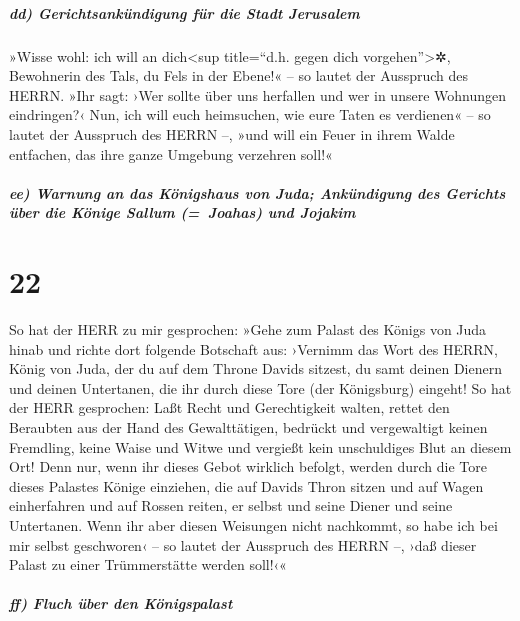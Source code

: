 \hypertarget{dd-gerichtsankuxfcndigung-fuxfcr-die-stadt-jerusalem}{%
\subparagraph{dd) Gerichtsankündigung für die Stadt
Jerusalem}\label{dd-gerichtsankuxfcndigung-fuxfcr-die-stadt-jerusalem}}

»Wisse wohl: ich will an dich\textless sup title=``d.h.
gegen dich vorgehen''\textgreater✲, Bewohnerin des Tals, du Fels in der
Ebene!« -- so lautet der Ausspruch des HERRN. »Ihr sagt: ›Wer sollte
über uns herfallen und wer in unsere Wohnungen eindringen?‹
Nun, ich will euch heimsuchen, wie eure Taten es
verdienen« -- so lautet der Ausspruch des HERRN --, »und will ein Feuer
in ihrem Walde entfachen, das ihre ganze Umgebung verzehren soll!«

\hypertarget{ee-warnung-an-das-kuxf6nigshaus-von-juda-ankuxfcndigung-des-gerichts-uxfcber-die-kuxf6nige-sallum-joahas-und-jojakim}{%
\subparagraph{ee) Warnung an das Königshaus von Juda; Ankündigung des
Gerichts über die Könige Sallum (=~Joahas) und
Jojakim}\label{ee-warnung-an-das-kuxf6nigshaus-von-juda-ankuxfcndigung-des-gerichts-uxfcber-die-kuxf6nige-sallum-joahas-und-jojakim}}

\hypertarget{section-21}{%
\section{22}\label{section-21}}

So hat der HERR zu mir gesprochen: »Gehe zum Palast des
Königs von Juda hinab und richte dort folgende Botschaft aus:
›Vernimm das Wort des HERRN, König von Juda, der du auf
dem Throne Davids sitzest, du samt deinen Dienern und deinen Untertanen,
die ihr durch diese Tore (der Königsburg) eingeht! So hat
der HERR gesprochen: Laßt Recht und Gerechtigkeit walten, rettet den
Beraubten aus der Hand des Gewalttätigen, bedrückt und vergewaltigt
keinen Fremdling, keine Waise und Witwe und vergießt kein unschuldiges
Blut an diesem Ort! Denn nur, wenn ihr dieses Gebot
wirklich befolgt, werden durch die Tore dieses Palastes Könige
einziehen, die auf Davids Thron sitzen und auf Wagen einherfahren und
auf Rossen reiten, er selbst und seine Diener und seine Untertanen.
Wenn ihr aber diesen Weisungen nicht nachkommt, so habe
ich bei mir selbst geschworen‹ -- so lautet der Ausspruch des HERRN --,
›daß dieser Palast zu einer Trümmerstätte werden soll!‹«

\hypertarget{ff-fluch-uxfcber-den-kuxf6nigspalast}{%
\subparagraph{ff) Fluch über den
Königspalast}\label{ff-fluch-uxfcber-den-kuxf6nigspalast}}


